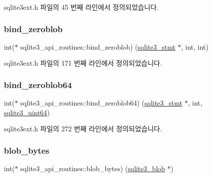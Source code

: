 sqlite3ext.\+h 파일의 45 번째 라인에서 정의되었습니다.

\mbox{\label{structsqlite3__api__routines_a921d22c6502ecd97f99dbd22be7dddfe}} 
\subsubsection{\texorpdfstring{bind\+\_\+zeroblob}{bind\_zeroblob}}
{\footnotesize\ttfamily int($\ast$ sqlite3\+\_\+api\+\_\+routines\+::bind\+\_\+zeroblob) (\hyperlink{sqlite3_8h_af2a033da1327cdd77f0a174a09aedd0c}{sqlite3\+\_\+stmt} $\ast$, int, int)}



sqlite3ext.\+h 파일의 171 번째 라인에서 정의되었습니다.

\mbox{\label{structsqlite3__api__routines_a850381c76781be8047b309a7f9d34e67}} 
\subsubsection{\texorpdfstring{bind\+\_\+zeroblob64}{bind\_zeroblob64}}
{\footnotesize\ttfamily int($\ast$ sqlite3\+\_\+api\+\_\+routines\+::bind\+\_\+zeroblob64) (\hyperlink{sqlite3_8h_af2a033da1327cdd77f0a174a09aedd0c}{sqlite3\+\_\+stmt} $\ast$, int, \hyperlink{sqlite3_8h_a181c20ecfd72bc6627635746d382c610}{sqlite3\+\_\+uint64})}



sqlite3ext.\+h 파일의 272 번째 라인에서 정의되었습니다.

\mbox{\label{structsqlite3__api__routines_ab46c80d45fb83507066179b3aa232c40}} 
\subsubsection{\texorpdfstring{blob\+\_\+bytes}{blob\_bytes}}
{\footnotesize\ttfamily int($\ast$ sqlite3\+\_\+api\+\_\+routines\+::blob\+\_\+bytes) (\hyperlink{sqlite3_8h_a3eb4857c157c542bb3fb7d8cbf38a662}{sqlite3\+\_\+blob} $\ast$)}



